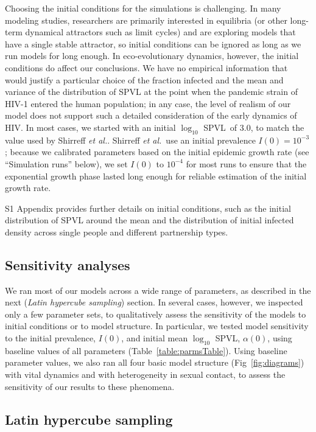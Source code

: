 \documentclass[10pt,letterpaper]{article}
\renewcommand{\figurename}{Fig}
\newcommand{\Lspvl}{$\log_{10}$ SPVL}
\newcommand{\etal}{\textit{et al.}}
\begin{document}
Choosing the initial conditions for the simulations is challenging.
In many modeling studies,
researchers are primarily interested in equilibria (or other long-term
dynamical attractors such as limit cycles) and are exploring models
that have a single stable attractor, so initial conditions can be
ignored as long as we run models for long enough.  In eco-evolutionary
dynamics, however, the initial conditions do affect our
conclusions. We have no empirical information that would justify a
particular choice of the fraction infected and the mean
and variance of the distribution of SPVL at the point when the
pandemic strain of HIV-1 entered the human population; in any case,
the level of realism of our model does not support such a detailed
consideration of the early dynamics of HIV.  In most cases, we started
with an initial \Lspvl\ of 3.0, to match the value used by
Shirreff \etal \cite{shirreff_transmission_2011}. Shirreff \etal\ use an initial prevalence $I(0)=10^{-3}$;
because we calibrated parameters based on the initial epidemic growth rate
(see ``Simulation runs'' below), we set $I(0)$ to $10^{-4}$
for most runs to ensure
that the exponential growth phase lasted long enough for reliable
estimation of the initial growth rate.

S1 Appendix provides
further details on initial conditions, such
as the initial distribution of SPVL around the mean and the
distribution of initial infected density across single people
and different partnership types.

\subsection*{Sensitivity analyses}

We ran most of our models across a wide range of parameters, as described
in the next (\emph{Latin hypercube sampling}) 
section. In several cases, however, we inspected only a few
parameter sets, to qualitatively assess the sensitivity of the models to
initial conditions or to model structure. 
In particular, we tested model sensitivity 
to the initial prevalence, $I(0)$, and initial mean \Lspvl,
$\alpha(0)$, using baseline values of all parameters (Table~\ref{table:parmsTable}).
Using baseline parameter values,
we also ran all four basic model structure (\figurename~\ref{fig:diagrams})
with vital dynamics and with heterogeneity in sexual contact,
to assess the sensitivity of our results to these phenomena.

\subsection*{Latin hypercube sampling}
\end{document}
